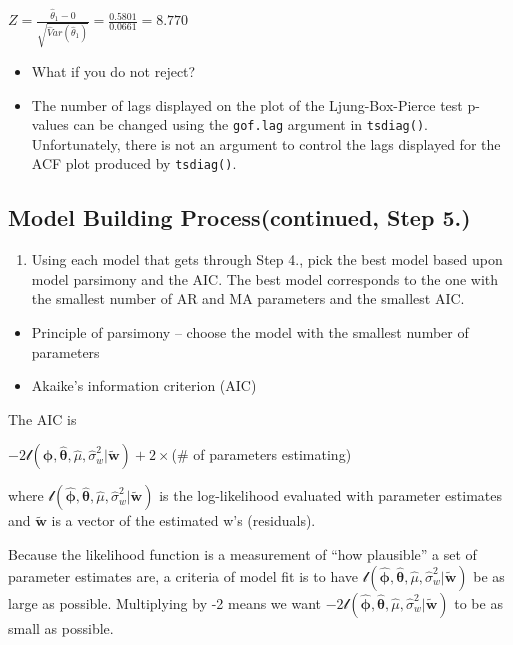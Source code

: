 \documentclass[
]{book}
\providecommand{\tightlist}{%
  \setlength{\itemsep}{0pt}\setlength{\parskip}{0pt}}
\theoremstyle{definition}
\theoremstyle{definition}
\theoremstyle{definition}
\theoremstyle{definition}
\theoremstyle{remark}
\begin{document}
\(Z=\frac{\hat \theta_1-0}{\sqrt{\hat Var(\hat \theta_1)}}=\frac{0.5801}{0.0661}=8.770\)

\begin{itemize}
\item
  What if you do not reject?
\item
  The number of lags displayed on the plot of the Ljung-Box-Pierce test p-values can be changed using the \texttt{gof.lag} argument in \texttt{tsdiag()}. Unfortunately, there is not an argument to control the lags displayed for the ACF plot produced by \texttt{tsdiag()}.
\end{itemize}

\hypertarget{model-building-processcontinued-step-5.}{%
\subsection{Model Building Process(continued, Step 5.)}\label{model-building-processcontinued-step-5.}}

\begin{enumerate}
\def\labelenumi{\arabic{enumi}.}
\setcounter{enumi}{4}
\tightlist
\item
  Using each model that gets through Step 4., pick the best model based upon model parsimony and the AIC. The best model corresponds to the one with the smallest number of AR and MA parameters and the smallest AIC.
\end{enumerate}

\begin{itemize}
\item
  Principle of parsimony -- choose the model with the smallest number of parameters
\item
  Akaike's information criterion (AIC)
\end{itemize}

The AIC is

\(-2 \mathcal l(\boldsymbol{\hat \phi}, \boldsymbol{\hat \theta}, \hat \mu, \hat \sigma_w^2| \boldsymbol{\tilde w})+2\times\)(\# of parameters estimating)

where \(\mathcal l(\boldsymbol{\hat \phi}, \boldsymbol{\hat \theta}, \hat \mu, \hat \sigma_w^2| \boldsymbol{\tilde w})\) is the log-likelihood evaluated with parameter estimates and \(\boldsymbol{\tilde w}\) is a vector of the estimated w's (residuals).

Because the likelihood function is a measurement of ``how plausible'' a set of parameter estimates are, a criteria of model fit is to have \(\mathcal l(\boldsymbol{\hat \phi}, \boldsymbol{\hat \theta}, \hat \mu, \hat \sigma_w^2| \boldsymbol{\tilde w})\) be as large as possible. Multiplying by -2 means we want \(-2\mathcal l(\boldsymbol{\hat \phi}, \boldsymbol{\hat \theta}, \hat \mu, \hat \sigma_w^2| \boldsymbol{\tilde w})\) to be as small as possible.
\end{document}
